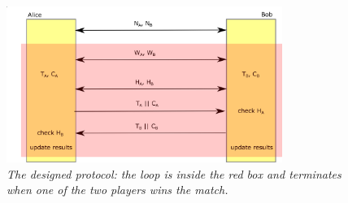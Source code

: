 \documentclass[11 pt]{article}
\begin{document}
\begin{figure}[!ht]
	\centering %
	\includegraphics[width=0.8\textwidth]{protocol-hw6-1699981.png} %
	\caption{\textit{The designed protocol: the loop is inside the red box and terminates when one of the two players wins the match.}} %
	\label{fig:protocol}
\end{figure}
\end{document}
